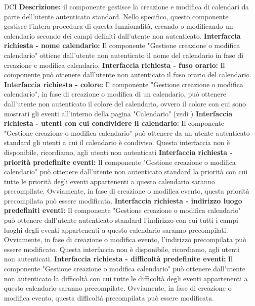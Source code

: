 \begin{listaPersonale}{DCI}
    \textbf{Descrizione:} il componente gestisce la creazione e modifica di calendari da parte dell'utente autenticato standard. Nello specifico, questo componente gestisce l'intera procedura di questa funzionalità, creando o modificando un calendario secondo dei campi definiti dall'utente non autenticato.
    \textbf{Interfaccia richiesta - nome calendario:} Il componente "Gestione creazione o modifica calendario" ottiene dall'utente non autenticato il nome del calendario in fase di creazione e modifica calendario.
    \textbf{Interfaccia richiesta - fuso orario:} Il componente può ottenere dall'utente non autenticato il fuso orario del calendario.
    \textbf{Interfaccia richiesta - colore:} Il componente "Gestione creazione o modifica calendario", in fase di creazione o modifica di un calendario, può ottenere dall'utente non autenticato il colore del calendario, ovvero il colore con cui sono mostrati gli eventi all'interno della pagina "Calendario" (vedi )
    \textbf{Interfaccia richiesta - utenti con cui condividere il calendario:} Il componente "Gestione creazione o modifica calendario" può ottenere da un utente autenticato standard gli utenti a cui il calendario è condiviso. Questa interfaccia non è disponibile, ricordiamo, agli utenti non autenticati
    \textbf{Interfaccia richiesta - priorità predefinite eventi:} Il componente "Gestione creazione o modifica calendario" può ottenere dall'utente non autenticato standard la priorità con cui tutte le priorità degli eventi appartenenti a questo calendario saranno precompilate. Ovviamente, in fase di creazione o modifica evento, questa priorità precompilata può essere modificata.
    \textbf{Interfaccia richiesta - indirizzo luogo predefiniti eventi:} Il componente "Gestione creazione o modifica calendario" può ottenere dall'utente autenticato standard l'indirizzo con cui tutti i campi luoghi degli eventi appartenenti a questo calendario saranno precompilati. Ovviamente, in fase di creazione o modifica evento, l'indirizzo precompilata può essere modificato. Questa interfaccia non è disponibile, ricordiamo, agli utenti non autenticati.
    \textbf{Interfaccia richiesta - difficoltà predefinite eventi:} Il componente "Gestione creazione o modifica calendario" può ottenere dall'utente non autenticato la difficoltà con cui tutte le difficoltà degli eventi appartenenti a questo calendario saranno precompilate. Ovviamente, in fase di creazione o modifica evento, questa difficoltà precompilata può essere modificata.

\end{listaPersonale}
